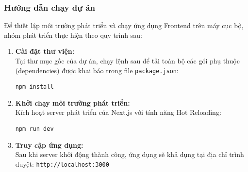 \subsubsection{Hướng dẫn chạy dự án}
Để thiết lập môi trường phát triển và chạy ứng dụng Frontend trên máy cục bộ, nhóm phát triển thực hiện theo quy trình sau:
\begin{enumerate}
    \item \textbf{Cài đặt thư viện:} \\
    Tại thư mục gốc của dự án, chạy lệnh sau để tải toàn bộ các gói phụ thuộc (dependencies) được khai báo trong file \texttt{package.json}:
    \begin{lstlisting}[language=bash, frame=single, basicstyle=\ttfamily]
npm install
    \end{lstlisting}

    \item \textbf{Khởi chạy môi trường phát triển:} \\
    Kích hoạt server phát triển của Next.js với tính năng Hot Reloading:
    \begin{lstlisting}[language=bash, frame=single, basicstyle=\ttfamily]
npm run dev
    \end{lstlisting}

    \item \textbf{Truy cập ứng dụng:} \\
    Sau khi server khởi động thành công, ứng dụng sẽ khả dụng tại địa chỉ trình duyệt: \texttt{http://localhost:3000}
\end{enumerate}

